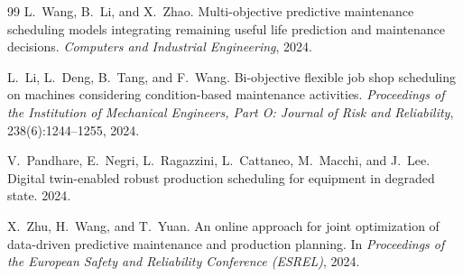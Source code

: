 \begin{thebibliography}{99}
L.~Wang, B.~Li, and X.~Zhao.
Multi-objective predictive maintenance scheduling models integrating remaining useful life prediction and maintenance decisions.
\emph{Computers and Industrial Engineering}, 2024.

L.~Li, L.~Deng, B.~Tang, and F.~Wang.
Bi-objective flexible job shop scheduling on machines considering condition-based maintenance activities.
\emph{Proceedings of the Institution of Mechanical Engineers, Part O: Journal of Risk and Reliability}, 238(6):1244--1255, 2024.

V.~Pandhare, E.~Negri, L.~Ragazzini, L.~Cattaneo, M.~Macchi, and J.~Lee.
Digital twin-enabled robust production scheduling for equipment in degraded state.
2024.

X.~Zhu, H.~Wang, and T.~Yuan.
An online approach for joint optimization of data-driven predictive maintenance and production planning.
In \emph{Proceedings of the European Safety and Reliability Conference (ESREL)}, 2024.

\end{thebibliography}
